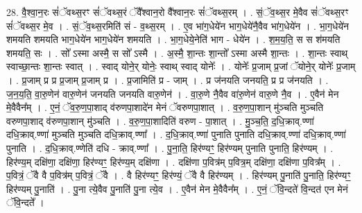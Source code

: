 \documentclass[17pt]{extarticle}
\begin{document}
28. वै॒श्वा॒न॒रः सं॑ॅवथ्स॒रꣳ सं॑ॅवथ्स॒रं ॅवै᳚श्वान॒रो वै᳚श्वान॒रः सं॑ॅवथ्स॒रम् । . सं॒ॅव॒थ्स॒र मे॒वैव सं॑ॅवथ्स॒रꣳ सं॑ॅवथ्स॒र मे॒व । . सं॒ॅव॒थ्स॒रमिति॑ सं - व॒थ्स॒रम् । . ए॒व भा॑ग॒धेये॑न भाग॒धेये॑नै॒वैव भा॑ग॒धेये॑न । . भा॒ग॒धेये॑न शमयति शमयति भाग॒धेये॑न भाग॒धेये॑न शमयति । . भा॒ग॒धेये॒नेति॑ भाग - धेये॑न । . श॒म॒य॒ति॒ स स श॑मयति शमयति॒ सः । . सो᳚ ऽस्मा अस्मै॒ स सो᳚ ऽस्मै । . अ॒स्मै॒ शा॒न्तः शा॒न्तो᳚ ऽस्मा अस्मै शा॒न्तः । . शा॒न्तः स्वाथ् स्वाच्छा॒न्तः शा॒न्तः स्वात् । . स्वाद् योने॒र् योनेः॒ स्वाथ् स्वाद् योनेः᳚ । . योनेः᳚ प्र॒जाम् प्र॒जां ॅयोने॒र् योनेः᳚ प्र॒जाम् । . प्र॒जाम् प्र प्र प्र॒जाम् प्र॒जाम् प्र । . प्र॒जामिति॑ प्र - जाम् । . प्र ज॑नयति जनयति॒ प्र प्र ज॑नयति । . ज॒न॒य॒ति॒ वा॒रु॒णेन॑ वारु॒णेन॑ जनयति जनयति वारु॒णेन॑ । . वा॒रु॒णे नै॒वैव वा॑रु॒णेन॑ वारु॒णे नै॒व । . ए॒वैन॑ मेन मे॒वैवैन᳚म् । . ए॒नं॒ ॅव॒रु॒ण॒पा॒शाद् व॑रुणपा॒शादे॑न मेनं ॅवरुणपा॒शात् । . व॒रु॒ण॒पा॒शान् मु॑ञ्चति मुञ्चति वरुणपा॒शाद् व॑रुणपा॒शान् मु॑ञ्चति । . व॒रु॒ण॒पा॒शादिति॑ वरुण - पा॒शात् । . मु॒ञ्च॒ति॒ द॒धि॒क्राव्.ण्णा॑ दधि॒क्राव्.ण्णा॑ मुञ्चति मुञ्चति दधि॒क्राव्.ण्णा᳚ । . द॒धि॒क्राव्.ण्णा॑ पुनाति पुनाति दधि॒क्राव्.ण्णा॑ दधि॒क्राव्.ण्णा॑ पुनाति । . द॒धि॒क्राव्.ण्णेति॑ दधि - क्राव्.ण्णा᳚ । . पु॒ना॒ति॒ हिर॑ण्यꣳ॒॒ हिर॑ण्यम् पुनाति पुनाति॒ हिर॑ण्यम् । . हिर॑ण्य॒म् दक्षि॑णा॒ दक्षि॑णा॒ हिर॑ण्यꣳ॒॒ हिर॑ण्य॒म् दक्षि॑णा । . दक्षि॑णा प॒वित्र॑म् प॒वित्र॒म् दक्षि॑णा॒ दक्षि॑णा प॒वित्र᳚म् । . प॒वित्रं॒ ॅवै वै प॒वित्र॑म् प॒वित्रं॒ ॅवै । . वै हिर॑ण्यꣳ॒॒ हिर॑ण्यं॒ ॅवै वै हिर॑ण्यम् । . हिर॑ण्यम् पु॒नाति॑ पु॒नाति॒ हिर॑ण्यꣳ॒॒ हिर॑ण्यम् पु॒नाति॑ । . पु॒ना त्ये॒वैव पु॒नाति॑ पु॒ना त्ये॒व । . ए॒वैन॑ मेन मे॒वैवैन᳚म् । . ए॒नं॒ ॅवि॒न्दते॑ वि॒न्दत॑ एन मेनं ॅवि॒न्दते᳚ । \newline
\end{document}
